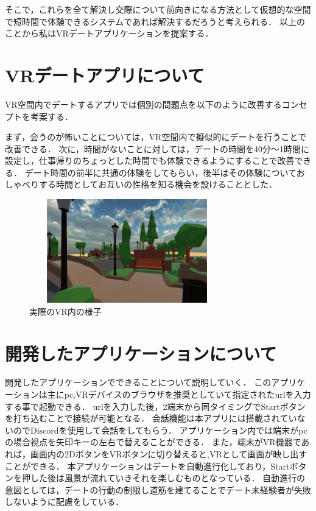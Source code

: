 \documentclass[twocolumn,10pt,a4j]{ltjsarticle}
\begin{document}
そこで，これらを全て解決し交際について前向きになる方法として仮想的な空間で短時間で体験できるシステムであれば解決するだろうと考えられる．
以上のことから私はVRデートアプリケーションを提案する．
\section{VRデートアプリについて}
VR空間内でデートするアプリでは個別の問題点を以下のように改善するコンセプトを考案する．


まず，会うのが怖いことについては，VR空間内で擬似的にデートを行うことで改善できる．
次に，時間がないことに対しては，デートの時間を40分〜1時間に設定し，仕事帰りのちょっとした時間でも体験できるようにすることで改善できる．
デート時間の前半に共通の体験をしてもらい，後半はその体験についておしゃべりする時間としてお互いの性格を知る機会を設けることとした．
\begin{figure}[h]
\begin{center}
\includegraphics[clip,width=85mm,height=45mm]{apurinaigazou.png}
\end{center}
 \caption{実際のVR内の様子}
\end{figure}

\section{開発したアプリケーションについて}
開発したアプリケーションでできることについて説明していく．
このアプリケーションは主にpc,VRデバイスのブラウザを推奨としていて指定されたurlを入力する事で起動できる．
urlを入力した後，2端末から同タイミングでStartボタンを打ち込むことで接続が可能となる．
会話機能は本アプリには搭載されていないのでDiscordを使用して会話をしてもらう．
アプリケーション内では端末がpcの場合視点を矢印キーの左右で替えることができる．
また，端末がVR機器であれば，画面内の2DボタンをVRボタンに切り替えると,VRとして画面が映し出すことができる．
本アプリケーションはデートを自動進行化しており，Startボタンを押した後は風景が流れていきそれを楽しむものとなっている．
自動進行の意図としては，デートの行動の制限し道筋を建てることでデート未経験者が失敗しないように配慮をしている．
\end{document}
